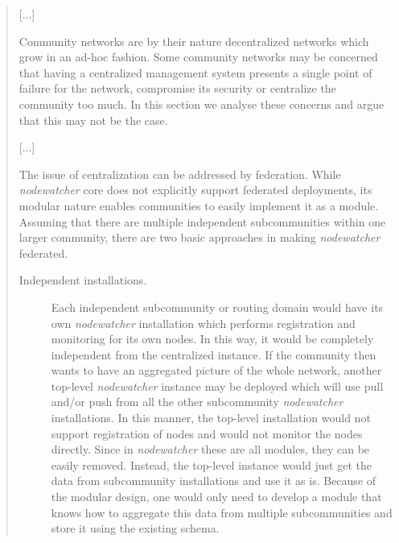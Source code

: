 \documentclass[12pt,twoside,a4paper]{report}
\newcommand{\nodewatcher}{\textit{nodewatcher}}
\begin{document}
\begin{quote}

[...]

Community networks are by their nature decentralized networks which grow in an ad-hoc fashion.
Some community networks may be concerned that having a centralized management system presents a single point of failure for the network, compromise its security or centralize the community too much.
In this section we analyse these concerns and argue that this may not be the case.

[...]

The issue of centralization can be addressed by federation. 
While \nodewatcher{} core does not explicitly support federated deployments, its modular nature enables communities to easily implement it as a module.
Assuming that there are multiple independent subcommunities within one larger community, there are two basic approaches in making \nodewatcher{} federated.

\begin{description}
    \item[Independent installations.] Each independent subcommunity or routing domain would have its own \nodewatcher{} installation which performs registration and monitoring for its own nodes.
    In this way, it would be completely independent from the centralized instance.
    If the community then wants to have an aggregated picture of the whole network, another top-level \nodewatcher{} instance may be deployed which will use pull and/or push from all the other subcommunity \nodewatcher{} installations.
    In this manner, the top-level installation would not support registration of nodes and would not monitor the nodes directly.
    Since in \nodewatcher{} these are all modules, they can be easily removed.
    Instead, the top-level instance would just get the data from subcommunity installations and use it as is.
    Because of the modular design, one would only need to develop a module that knows how to aggregate this data from multiple subcommunities and store it using the existing schema.


\end{description}
\end{quote}
\end{document}
